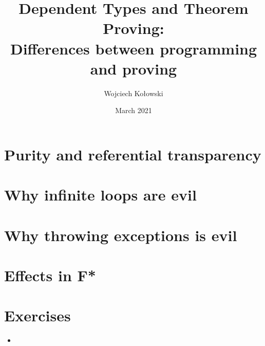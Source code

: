\documentclass{beamer}
\title{Dependent Types and Theorem Proving: \\Differences between programming and proving}
\author{Wojciech Kołowski}
\date{March 2021}
\begin{document}
\frame{\titlepage}
\frame{\tableofcontents}

\section{Purity and referential transparency}
\section{Why infinite loops are evil}
\section{Why throwing exceptions is evil}
\section{Effects in F*}
\section{Exercises}
	
\begin{frame}{}
\begin{itemize}
	\item 
\end{itemize}
\end{frame}
\end{document}
